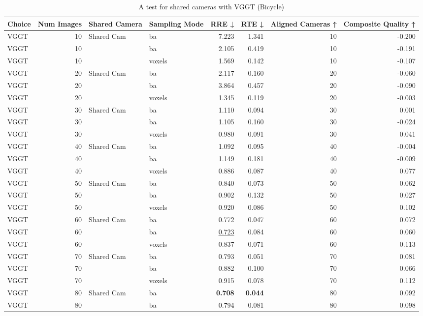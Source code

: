 \begin{table}[H]
\caption{A test for shared cameras with VGGT (Bicycle)}
\label{tab:06_shared_camera_vggt_bicycle}
\begin{tabular}{lrllrrrr}
\toprule
Choice & Num Images & Shared Camera & Sampling Mode & RRE ↓ & RTE ↓ & Aligned Cameras ↑ & Composite Quality ↑ \\
\midrule
VGGT & 10 & Shared Cam & ba & 7.223 & 1.341 & 10 & -0.200 \\
VGGT & 10 &  & ba & 2.105 & 0.419 & 10 & -0.191 \\
VGGT & 10 &  & voxels & 1.569 & 0.142 & 10 & -0.107 \\
VGGT & 20 & Shared Cam & ba & 2.117 & 0.160 & 20 & -0.060 \\
VGGT & 20 &  & ba & 3.864 & 0.457 & 20 & -0.090 \\
VGGT & 20 &  & voxels & 1.345 & 0.119 & 20 & -0.003 \\
VGGT & 30 & Shared Cam & ba & 1.110 & 0.094 & 30 & 0.001 \\
VGGT & 30 &  & ba & 1.105 & 0.160 & 30 & -0.024 \\
VGGT & 30 &  & voxels & 0.980 & 0.091 & 30 & 0.041 \\
VGGT & 40 & Shared Cam & ba & 1.092 & 0.095 & 40 & -0.004 \\
VGGT & 40 &  & ba & 1.149 & 0.181 & 40 & -0.009 \\
VGGT & 40 &  & voxels & 0.886 & 0.087 & 40 & 0.077 \\
VGGT & 50 & Shared Cam & ba & 0.840 & 0.073 & 50 & 0.062 \\
VGGT & 50 &  & ba & 0.902 & 0.132 & 50 & 0.027 \\
VGGT & 50 &  & voxels & 0.920 & 0.086 & 50 & 0.102 \\
VGGT & 60 & Shared Cam & ba & 0.772 & 0.047 & 60 & 0.072 \\
VGGT & 60 &  & ba & \underline{0.723} & 0.084 & 60 & 0.060 \\
VGGT & 60 &  & voxels & 0.837 & 0.071 & 60 & 0.113 \\
VGGT & 70 & Shared Cam & ba & 0.793 & 0.051 & 70 & 0.081 \\
VGGT & 70 &  & ba & 0.882 & 0.100 & 70 & 0.066 \\
VGGT & 70 &  & voxels & 0.915 & 0.078 & 70 & 0.112 \\
VGGT & 80 & Shared Cam & ba & \textbf{0.708} & \textbf{0.044} & 80 & 0.092 \\
VGGT & 80 &  & ba & 0.794 & 0.081 & 80 & 0.098 \\

\end{tabular}
\end{table}
